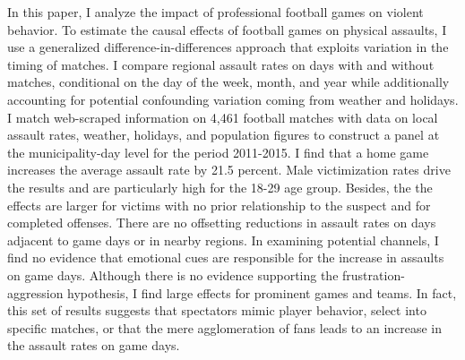 In this paper, I analyze the impact of professional football games on violent behavior. To estimate the causal effects of football games on physical assaults, I use a generalized difference-in-differences approach that exploits variation in the timing of matches. I compare regional assault rates on days with and without matches, conditional on the day of the week, month, and year while additionally accounting for potential confounding variation coming from weather and holidays. I match web-scraped information on 4,461 football matches with data on local assault rates, weather, holidays, and population figures to construct a panel at the municipality-day level for the period 2011-2015. I find that a home game increases the average assault rate by 21.5 percent. Male victimization rates drive the results and are particularly high for the 18-29 age group. Besides, the the effects are larger for victims with no prior relationship to the suspect and for completed offenses. There are no offsetting reductions in assault rates on days adjacent to game days or in nearby regions. In examining potential channels, I find no evidence that emotional cues are responsible for the increase in assaults on game days. Although there is no evidence supporting the frustration-aggression hypothesis, I find large effects for prominent games and teams. In fact, this set of results suggests that spectators mimic player behavior, select into specific matches, or that the mere agglomeration of fans leads to an increase in the assault rates on game days. 




